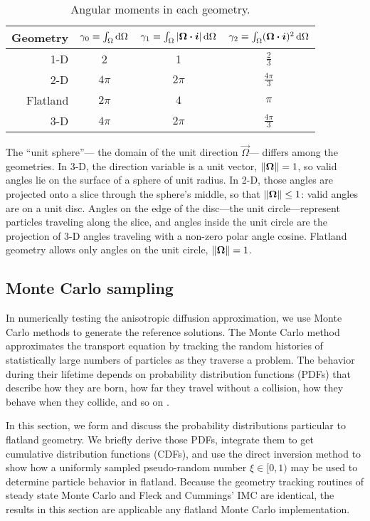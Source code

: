 \begin{table}[htb]
  \centering
  \begin{tabular}{rccc}
\toprule
   Geometry
   & $\gamma_0 \equiv \int_\Omega \mathop{}\!\mathrm{d}\Omega$
   & $\gamma_1 \equiv \int_\Omega \left| \bm{\Omega}\bm{\cdot}\bm{i} \right| \mathop{}\!\mathrm{d}\Omega$
   & $\gamma_2 \equiv \int_\Omega (\bm{\Omega}\bm{\cdot}\bm{i})^2 \mathop{}\!\mathrm{d}\Omega$
\\ \midrule
   1-D & 2 & 1 & $\frac{2}{3}$
   \\
   2-D & $4\pi$ & $2\pi$ & $\frac{4\pi}{3}$
   \\
   Flatland & $2\pi$ & $4$ & $\pi$
   \\
   3-D & $4\pi$ & $2\pi$ & $\frac{4\pi}{3}$
\\ \bottomrule
  \end{tabular}
  \caption{Angular moments in each geometry.}
  \label{tab:angularMoments}
\end{table}

The ``unit sphere''---%
the domain of the unit direction $\vec{\Omega}$---%
differs among the geometries. In 3-D, the direction variable is a unit vector,
$\left\| \bm{\Omega} \right\|=1$, so valid angles
lie on the surface of a sphere of unit radius. In 2-D, those angles are
projected onto a slice through the sphere's middle, so that
$\left\| \bm{\Omega} \right\| \le 1$: valid angles are on a unit disc. Angles on the edge
of the disc---the unit circle---represent particles traveling along the slice,
and angles inside the unit circle are the projection of 3-D angles traveling with a
non-zero polar angle cosine. Flatland geometry allows only angles on the unit
circle, $\left\| \bm{\Omega} \right\|=1$.

\subsection{Monte Carlo sampling}

In numerically testing the anisotropic diffusion approximation, we use Monte Carlo
methods to generate the reference solutions.
The Monte Carlo method approximates the transport equation by tracking the
random histories of statistically large numbers of particles as they traverse a
problem. The behavior during their lifetime depends on probability distribution
functions (PDFs) that describe how they are born, how far they travel without a
collision, how they behave when they collide, and so on \cite{Lew1984,Bro2004a}.

In this section, we form and discuss the probability distributions particular to
flatland geometry. We briefly derive those PDFs,
integrate them to get cumulative distribution functions
(CDFs), and use the direct inversion method to show how a uniformly sampled
pseudo-random number $\xi \in [0,1)$ may be used to determine particle behavior
in flatland. Because the geometry tracking routines of steady state Monte Carlo
and Fleck and Cummings' IMC are identical, the results in this section are
applicable any flatland Monte Carlo implementation.

